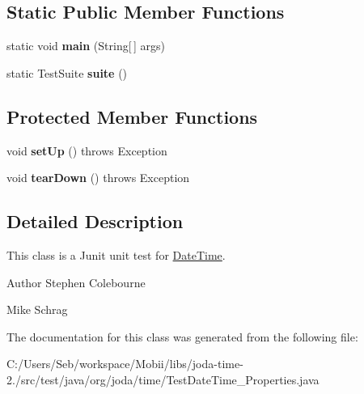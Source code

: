 \subsection*{Static Public Member Functions}
\begin{DoxyCompactItemize}
\item 
\hypertarget{classorg_1_1joda_1_1time_1_1_test_date_time___properties_a0c487dd3b4bd3348bcd72c5dd90aba88}{static void {\bfseries main} (String\mbox{[}$\,$\mbox{]} args)}\label{classorg_1_1joda_1_1time_1_1_test_date_time___properties_a0c487dd3b4bd3348bcd72c5dd90aba88}

\item 
\hypertarget{classorg_1_1joda_1_1time_1_1_test_date_time___properties_a0430622a7e4bd3ce4f7d5a1ea3825ab3}{static Test\-Suite {\bfseries suite} ()}\label{classorg_1_1joda_1_1time_1_1_test_date_time___properties_a0430622a7e4bd3ce4f7d5a1ea3825ab3}

\end{DoxyCompactItemize}
\subsection*{Protected Member Functions}
\begin{DoxyCompactItemize}
\item 
\hypertarget{classorg_1_1joda_1_1time_1_1_test_date_time___properties_aca3e39f6c77eb8bc4eee7e358e951e23}{void {\bfseries set\-Up} ()  throws Exception }\label{classorg_1_1joda_1_1time_1_1_test_date_time___properties_aca3e39f6c77eb8bc4eee7e358e951e23}

\item 
\hypertarget{classorg_1_1joda_1_1time_1_1_test_date_time___properties_a88a44957c7fb16f0845394f3079b633f}{void {\bfseries tear\-Down} ()  throws Exception }\label{classorg_1_1joda_1_1time_1_1_test_date_time___properties_a88a44957c7fb16f0845394f3079b633f}

\end{DoxyCompactItemize}


\subsection{Detailed Description}
This class is a Junit unit test for \hyperlink{classorg_1_1joda_1_1time_1_1_date_time}{Date\-Time}.

\begin{DoxyAuthor}{Author}
Stephen Colebourne 

Mike Schrag 
\end{DoxyAuthor}


The documentation for this class was generated from the following file\-:\begin{DoxyCompactItemize}
\item 
C\-:/\-Users/\-Seb/workspace/\-Mobii/libs/joda-\/time-\/2./src/test/java/org/joda/time/Test\-Date\-Time\-\_\-\-Properties.\-java\end{DoxyCompactItemize}
